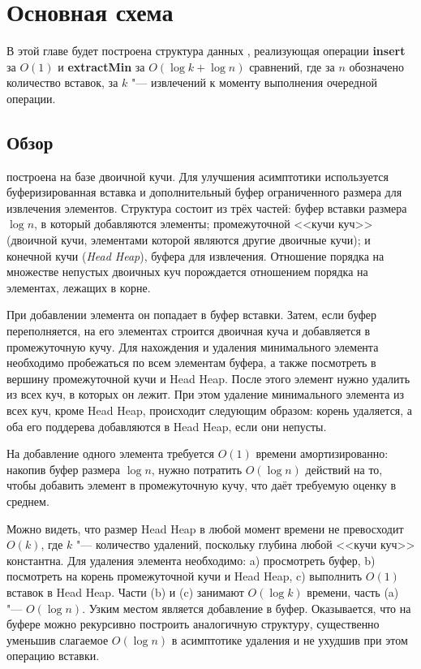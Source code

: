 \chapter{Основная схема} \label{chapt-sch}

В этой главе будет построена структура данных \SCH, реализующая операции \textbf{insert}
за $O(1)$ и \textbf{extractMin} за $O(\log k + \log n)$ сравнений, где
за $n$ обозначено количество вставок, за $k$ "--- извлечений к моменту выполнения
очередной операции.

\section{Обзор}
\SCH построена на базе двоичной кучи. Для улучшения
асимптотики используется буферизированная вставка и дополнительный буфер
ограниченного размера для извлечения элементов. Структура состоит из трёх
частей: буфер вставки размера $\log n$, в который добавляются элементы; промежуточной
<<кучи куч>> (двоичной кучи, элементами которой являются другие двоичные кучи);
и конечной кучи (\emph{Head Heap}), буфера для извлечения. Отношение порядка
на множестве непустых двоичных куч порождается отношением порядка на элементах,
лежащих в корне.

При добавлении элемента он попадает в буфер вставки. Затем, если буфер переполняется,
на его элементах строится двоичная куча и добавляется в промежуточную кучу.
Для нахождения и удаления минимального элемента необходимо пробежаться по всем
элементам буфера, а также посмотреть в вершину промежуточной кучи и Head Heap.
После этого элемент нужно удалить из всех куч, в которых он лежит. При этом
удаление минимального элемента из всех куч, кроме Head Heap, происходит следующим образом:
корень удаляется, а оба его поддерева добавляются в Head Heap, если они непусты.

На добавление одного элемента требуется $O(1)$ времени амортизированно: накопив
буфер размера $\log n$, нужно потратить $O(\log n)$ действий на то, чтобы добавить
элемент в промежуточную кучу, что даёт требуемую оценку в среднем.

Можно видеть, что размер Head Heap в любой момент времени не превосходит $O(k)$, где
$k$ "--- количество удалений, поскольку глубина любой <<кучи куч>> константна.
Для удаления элемента необходимо: a) просмотреть буфер, b) посмотреть
на корень промежуточной кучи и Head Heap, c) выполнить $O(1)$ вставок в Head Heap.
Части (b) и (c) занимают $O(\log k)$ времени, часть (a) "--- $O(\log n)$.
Узким местом является добавление в буфер. Оказывается, что на буфере можно
рекурсивно построить аналогичную структуру, существенно уменьшив слагаемое
$O(\log n)$ в асимптотике удаления и не ухудшив при этом операцию вставки.

